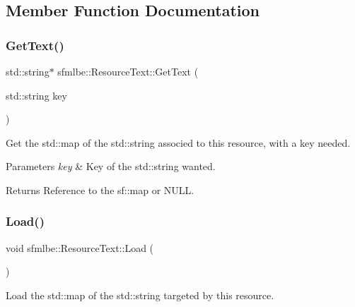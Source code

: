 \subsection{Member Function Documentation}
\mbox{\label{classsfmlbe_1_1_resource_text_a36954e8d61e7406f4923fda6acd4e4f3}} 
\subsubsection{\texorpdfstring{Get\+Text()}{GetText()}}
{\footnotesize\ttfamily std\+::string$\ast$ sfmlbe\+::\+Resource\+Text\+::\+Get\+Text (\begin{DoxyParamCaption}\item[{std\+::string}]{key }\end{DoxyParamCaption})}



Get the std\+::map of the std\+::string associed to this resource, with a key needed. 


\begin{DoxyParams}{Parameters}
{\em key} & Key of the std\+::string wanted. \\
\hline
\end{DoxyParams}
\begin{DoxyReturn}{Returns}
Reference to the sf\+::map or N\+U\+LL. 
\end{DoxyReturn}
\mbox{\label{classsfmlbe_1_1_resource_text_a1176965f3e9d26c618688f7899b4b58b}} 
\subsubsection{\texorpdfstring{Load()}{Load()}}
{\footnotesize\ttfamily void sfmlbe\+::\+Resource\+Text\+::\+Load (\begin{DoxyParamCaption}{ }\end{DoxyParamCaption})\hspace{0.3cm}{\ttfamily [virtual]}}



Load the std\+::map of the std\+::string targeted by this resource. 

